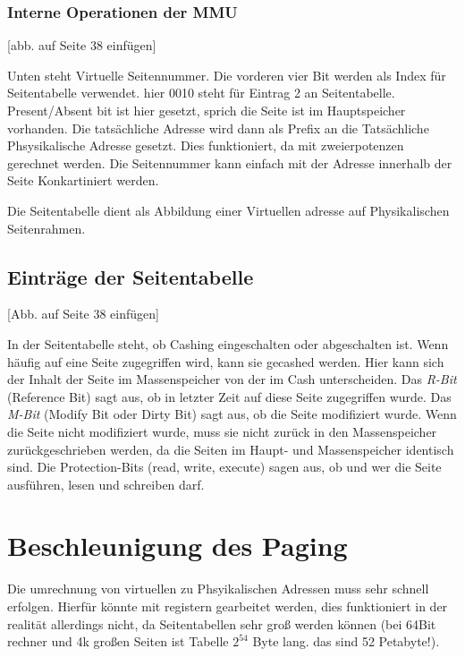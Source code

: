 \subsubsection{Interne Operationen der MMU}

[abb. auf Seite 38 einfügen]

Unten steht Virtuelle Seitennummer. Die vorderen vier Bit werden als Index für Seitentabelle verwendet. hier 0010 steht für Eintrag 2 an Seitentabelle. Present/Absent bit ist hier gesetzt, sprich die Seite ist im Hauptspeicher vorhanden. Die tatsächliche Adresse wird dann als Prefix an die Tatsächliche Phsysikalische Adresse gesetzt. Dies funktioniert, da mit zweierpotenzen gerechnet werden. Die Seitennummer kann einfach mit der Adresse innerhalb der Seite Konkartiniert werden.

Die Seitentabelle dient als Abbildung einer Virtuellen adresse auf Physikalischen Seitenrahmen. 

\subsection{Einträge der Seitentabelle}

[Abb. auf Seite 38 einfügen]

In der Seitentabelle steht, ob Cashing eingeschalten oder abgeschalten ist. Wenn häufig auf eine Seite zugegriffen wird, kann sie gecashed werden. Hier kann sich der Inhalt der Seite im Massenspeicher von der im Cash unterscheiden. Das \textit{R-Bit} (Reference Bit) sagt aus, ob in letzter Zeit auf diese Seite zugegriffen wurde. Das \textit{M-Bit} (Modify Bit oder Dirty Bit) sagt aus, ob die Seite modifiziert wurde. Wenn die Seite nicht modifiziert wurde, muss sie nicht zurück in den Massenspeicher zurückgeschrieben werden, da die Seiten im Haupt- und Massenspeicher identisch sind. Die Protection-Bits (read, write, execute) sagen aus, ob und wer die Seite ausführen, lesen und schreiben darf.

\section{Beschleunigung des Paging}

Die umrechnung von virtuellen zu Phsyikalischen Adressen muss sehr schnell erfolgen. Hierfür könnte mit registern gearbeitet werden, dies funktioniert in der realität allerdings nicht, da Seitentabellen sehr groß werden können (bei 64Bit rechner und 4k großen Seiten ist Tabelle $2^{54}$ Byte lang. das sind 52 Petabyte!).

